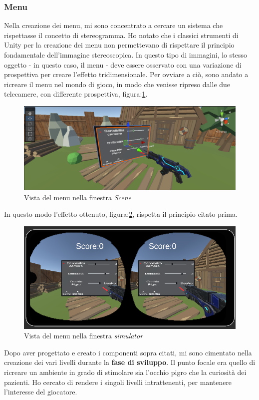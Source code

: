 \documentclass[
a4paper,
cleardoublepage=empty,
headings=twolinechapter,
numbers=autoenddot,
]{scrbook}
\begin{document}
     \subsubsection{Menu}
     Nella creazione dei menu, mi sono concentrato a cercare un sistema che rispettasse il concetto di stereogramma\cite{Stereogramma}. Ho notato che i classici strumenti di Unity per la creazione dei menu non permettevano di rispettare il principio fondamentale dell'immagine stereoscopica. In questo tipo di immagini, lo stesso oggetto - in questo caso, il menu - deve essere osservato con una variazione di prospettiva per creare l'effetto tridimensionale.
     Per ovviare a ciò, sono andato a ricreare il menu nel mondo di gioco, in modo che venisse ripreso dalle due telecamere, con differente prospettiva, figura:\ref{fig:menu_scena}.
     \begin{figure}[h]
    	\centering
    	\includegraphics[width=0.6\linewidth]{image/menu_scena}
    	\caption{Vista del menu nella finestra \textit{Scene}}
    	\label{fig:menu_scena}
    \end{figure}
    In questo modo l'effetto ottenuto, figura:\ref{fig:menu_simulator}, rispetta il principio citato prima.
     \begin{figure}[h]
    	\centering
    	\includegraphics[width=0.6\linewidth]{image/menu_simulatore}
    	\caption{Vista del menu nella finestra \textit{simulator}}
    	\label{fig:menu_simulator}
    \end{figure}
    Dopo aver progettato e creato i componenti sopra citati, mi sono cimentato nella creazione dei vari livelli durante la \textbf{fase di sviluppo}. Il punto focale era quello di ricreare un ambiente in grado di stimolare sia l'occhio pigro che la curiosità dei pazienti. Ho cercato di rendere i singoli livelli intrattenenti, per mantenere l'interesse del giocatore.
\end{document}
